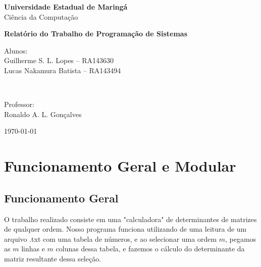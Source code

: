 \documentclass[12pt]{article}
\begin{document}
\begin{titlepage}
    \centering
    \vspace*{1cm}
    
    \Large\textbf{Universidade Estadual de Maringá} \\
    \large Ciência da Computação \\
    \vspace{5cm}
    
    \Huge\textbf{Relatório do Trabalho de Programação de Sistemas} \\
    \vspace{5cm}
    
    \begin{minipage}{0.4\textwidth}
        \begin{flushleft} \large
            Alunos:\\
            Guilherme S. L. Lopes -- RA143630\\
            Lucas Nakamura Batista -- RA143494\\
        \end{flushleft}
    \end{minipage}
    ~
    \begin{minipage}{0.4\textwidth}
        \begin{flushright} \large
            Professor: \\
            Ronaldo A. L. Gonçalves
        \end{flushright}
    \end{minipage}
    
    \vfill %
    
    \large \today \\
\end{titlepage}

\section{Funcionamento Geral e Modular}
\subsection{Funcionamento Geral}
O trabalho realizado consiste em uma "calculadora" de determinantes de matrizes 
de qualquer ordem. Nosso programa funciona utilizando de uma leitura de um 
arquivo .txt com uma tabela de números, e ao selecionar uma ordem $m$, pegamos 
as $m$ linhas e $m$ colunas dessa tabela, e fazemos o cálculo do determinante 
da matriz resultante dessa seleção.
\end{document}
